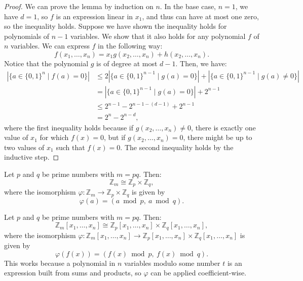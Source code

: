 \begin{proof}
We can prove the lemma by induction on $n$. In the base case, $n = 1$, we have $d = 1$, so $f$ is an expression linear in $x_1$, and thus can have at most one zero, so the inequality holds. Suppose we have shown the inequality holds for polynomials of $n-1$ variables. We show that it also holds for any polynomial $f$ of $n$ variables. We can express $f$ in the following way:
\[
f(x_1, \ldots, x_n) = x_1 g(x_2, \ldots, x_n) + h(x_2, \ldots, x_n).
\]
Notice that the polynomial $g$ is of degree at most $d-1$. Then, we have:
\begin{align*}
|\{a \in \{0,1\}^n \mid f(a) = 0\}| 
&\leq 2|\{a \in \{0,1\}^{n-1} \mid g(a) = 0\}| + |\{a \in \{0,1\}^{n-1} \mid g(a) \neq 0\}| \\
&= |\{a \in \{0,1\}^{n-1} \mid g(a) = 0\}| + 2^{n-1} \\
&\leq 2^{n-1} - 2^{n-1-(d-1)} + 2^{n-1} \\
&= 2^n - 2^{n-d},
\end{align*}
where the first inequality holds because if $g(x_2, \ldots, x_n) \neq 0$, there is exactly one value of $x_1$ for which $f(x) = 0$, but if $g(x_2, \ldots, x_n) = 0$, there might be up to two values of $x_1$ such that $f(x) = 0$. The second inequality holds by the inductive step.
\end{proof}

\begin{theorem}
\label{app:crt-int}
Let $p$ and $q$ be prime numbers with $m = pq$. Then:
\[
\mathbb{Z}_m \cong \mathbb{Z}_p \times \mathbb{Z}_q,
\]
where the isomorphism $\varphi : \mathbb{Z}_m \to \mathbb{Z}_p \times \mathbb{Z}_q$ is given by
\[
\varphi(a) = (a \bmod p,\ a \bmod q).
\]
\end{theorem}

\begin{theorem}
\label{app:crt-poly}
Let $p$ and $q$ be prime numbers with $m = pq$. Then:
\[
\mathbb{Z}_m[x_1, \ldots, x_n] \cong \mathbb{Z}_p[x_1, \ldots, x_n] \times \mathbb{Z}_q[x_1, \ldots, x_n],
\]
where the isomorphism $\varphi : \mathbb{Z}_m[x_1, \ldots, x_n] \to \mathbb{Z}_p[x_1, \ldots, x_n] \times \mathbb{Z}_q[x_1, \ldots, x_n]$ is given by
\[
\varphi(f(x)) = (f(x) \bmod p,\ f(x) \bmod q).
\]
This works because a polynomial in $n$ variables modulo some number $t$ is an expression built from sums and products, so $\varphi$ can be applied coefficient-wise.
\end{theorem}
